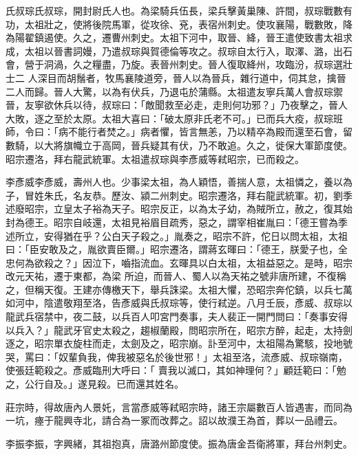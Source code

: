 
\begin{pinyinscope}

 氏叔琮氏叔琮，開封尉氏人也。為梁騎兵伍長，梁兵擊黃巢陳、許間，叔琮戰數有功，太祖壯之，使將後院馬軍，從攻徐、兗，表宿州刺史。使攻襄陽，戰數敗，降為陽翟鎮遏使。久之，遷曹州刺史。太祖下河中，取晉、絳，晉王遣使致書太祖求成，太祖以晉書詞嫚，乃遣叔琮與賀德倫等攻之。叔琮自太行入，取澤、潞，出石會，營于洞渦，久之糧盡，乃旋。表晉州刺史。晉人復取絳州，攻臨汾，叔琮選壯士二
 人深目而胡鬚者，牧馬襄陵道旁，晉人以為晉兵，雜行道中，伺其怠，擒晉二人而歸。晉人大驚，以為有伏兵，乃退屯於蒲縣。太祖遣友寧兵萬人會叔琮禦晉，友寧欲休兵以待，叔琮曰：「敵聞救至必走，走則何功邪？」乃夜擊之，晉人大敗，逐之至於太原。太祖大喜曰：「破太原非氏老不可。」已而兵大疫，叔琮班師，令曰：「病不能行者焚之。」病者懼，皆言無恙，乃以精卒為殿而還至石會，留數騎，以大將旗幟立于高岡，晉兵疑其有伏，乃不敢追。久之，徙保大軍節度使。昭宗遷洛，拜右龍武統軍。太祖遣叔琮與李彥威等弒昭宗，已而殺之。



 李彥威李彥威，壽州人也。少事梁太祖，為人穎悟，善揣人意，太祖憐之，養以為子，冒姓朱氏，名友恭。歷汝、潁二州刺史。昭宗遷洛，拜右龍武統軍。初，劉季述廢昭宗，立皇太子裕為天子。昭宗反正，以為太子幼，為賊所立，赦之，復其始封為德王。昭宗自岐還，太祖見裕眉目疏秀，惡之，謂宰相崔胤曰：「德王嘗為季述所立，安得猶在乎？公白天子殺之。」胤奏之，昭宗不許，佗日以問太祖，太祖曰：「臣安敢及之，胤欲賣臣爾。」昭宗遷洛，謂蔣玄暉曰：「德王，朕愛子也，全忠何為欲殺之？」因泣下，嚙指流血。玄暉具以白太祖，太祖益惡之。是時，昭宗改元天祐，遷于東都，為梁
 所迫，而晉人、蜀人以為天祐之號非唐所建，不復稱之，但稱天復。王建亦傳檄天下，舉兵誅梁。太祖大懼，恐昭宗奔佗鎮，以兵七萬如河中，陰遣敬翔至洛，告彥威與氏叔琮等，使行弒逆。八月壬辰，彥威、叔琮以龍武兵宿禁中，夜二鼓，以兵百人叩宮門奏事，夫人裴正一開門問曰：「奏事安得以兵入？」龍武牙官史太殺之，趨椒蘭殿，問昭宗所在，昭宗方醉，起走，太持劍逐之，昭宗單衣旋柱而走，太劍及之，昭宗崩。訃至河中，太祖陽為驚駭，投地號哭，罵曰：「奴輩負我，俾我被惡名於後世邪！」太祖至洛，流彥威、叔琮嶺南，使張廷範殺之。彥威臨刑大呼曰：「
 賣我以滅口，其如神理何？」顧廷範曰：「勉之，公行自及。」遂見殺。已而還其姓名。



 莊宗時，得故唐內人景奼，言當彥威等弒昭宗時，諸王宗屬數百人皆遇害，而同為一坑，瘞于龍興寺北，請合為一冢而改葬之。詔以故濮王為首，葬以一品禮云。



 李振李振，字興緒，其祖抱真，唐潞州節度使。振為唐金吾衛將軍，拜台州刺史。




\end{pinyinscope}
